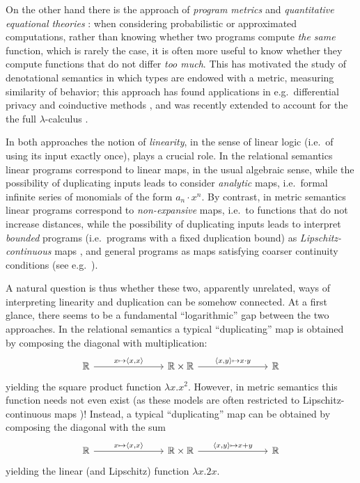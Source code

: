 On the other hand there is the approach of \emph{program metrics} \cite{} and \emph{quantitative equational theories} \cite{Mardare}: when considering probabilistic or approximated computations, rather than knowing whether two programs compute \emph{the same} function, which is rarely the case, it is often more useful to know whether they compute functions that do not differ \emph{too much}. This has motivated the study of denotational semantics in which types are endowed with a metric, measuring similarity of behavior; this approach has found  applications in e.g.~differential privacy \cite{} and coinductive methods \cite{}, and was recently extended to account for the the full $\lambda$-calculus \cite{LICS2021, FSCD2022}.

In both approaches the notion of \emph{linearity}, in the sense of linear logic \cite{linearlogic} (i.e.~of using its input exactly once), plays a crucial role.
In the relational semantics linear programs correspond to linear maps, in the usual algebraic sense, while the possibility of duplicating inputs leads to consider \emph{analytic} maps, i.e.~formal infinite series of monomials of the form $a_{n}\cdot x^{n}$.
By contrast, in metric semantics linear programs correspond to \emph{non-expansive} maps, i.e.~to functions that do not increase distances, while the possibility of duplicating inputs leads to interpret \emph{bounded} programs (i.e.~programs with a fixed duplication bound) as \emph{Lipschitz-continuous} maps \cite{Gabo2017}, and general programs as maps satisfying coarser 
continuity conditions (see e.g.~\cite{LICS2021}).


A natural question is thus whether these two, apparently unrelated, ways of interpreting linearity and duplication can be somehow connected. At a first glance, there seems to be a fundamental ``logarithmic'' gap between the two approaches.
In the relational semantics a typical ``duplicating'' map is obtained by composing the diagonal with multiplication:
$$
\begin{tikzcd}
\mathbb R \ar{rrr}{x\mapsto \langle x, x\rangle}
 & &  &
 \mathbb R\times \mathbb R 
 \ar{rrr}{\langle x,y\rangle \mapsto x\cdot y}
 & & & \mathbb R
\end{tikzcd}
$$
yielding the square product function $\lambda x.x^{2}$.
However, in metric semantics this function needs not even exist (as these models are often restricted to Lipschitz-continuous maps \cite{Gabo2017})! Instead, a typical ``duplicating'' map can be obtained by composing the diagonal with the sum 
$$
\begin{tikzcd}
\mathbb R \ar{rrr}{x\mapsto \langle x, x\rangle}
 & &  &
 \mathbb R\times \mathbb R 
 \ar{rrr}{\langle x,y\rangle \mapsto x+y}
 & & & \mathbb R
\end{tikzcd}
$$
yielding the linear (and Lipschitz) function $\lambda x.2x$.

